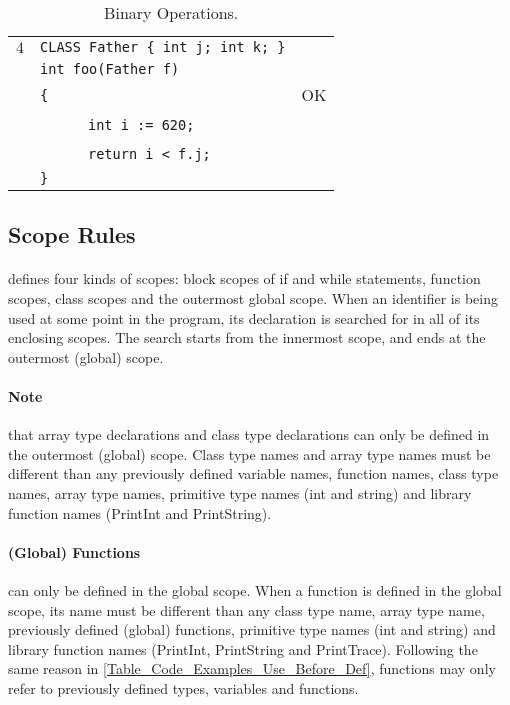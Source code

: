 \documentclass{article}
\begin{document}
\begin{table}[h]
\begin{tabular}{|l|l|l|}
\hline
 $4$ & \verb"CLASS Father { int j; int k; }" &    \\
     & \verb"int foo(Father f)"              &    \\
     & \verb"{"                              & OK \\
     & ~ ~ ~ ~\verb"int i := 620;"           &    \\
     & ~ ~ ~ ~\verb"return i < f.j;"         &    \\
     & \verb"}"                              &    \\
\hline
\end{tabular}
\caption{Binary Operations.
\label{Table_Code_Examples_Binary_Operations}}
\end{table}
\newpage
\subsection{Scope Rules}
\label{subsection_Scope_Rules}
\paragraph{\plname} defines four kinds of scopes:
block scopes of if and while statements,
function scopes,
class scopes and
the outermost global scope.
When an identifier is being used at some point in the program,
its declaration is searched for in all of its enclosing scopes.
The search starts from the innermost scope, 
and ends at the outermost (global) scope.
\paragraph{Note} that array type declarations and
class type declarations can only be defined
in the outermost (global) scope.
Class type names and array type names must be different than any
previously defined variable names, function names, class type names,
array type names, primitive type names (int and string) and library function names
(PrintInt and PrintString).
\paragraph{(Global) Functions} can only be defined in the global scope.
When a function is defined in the global scope, its name must be different than
any class type name, array type name, previously defined (global) functions,
primitive type names (int and string) and library function names (PrintInt, PrintString and PrintTrace).
Following the same reason in \ref{Table_Code_Examples_Use_Before_Def},
functions may only refer to previously defined types, variables and functions.
\end{document}
